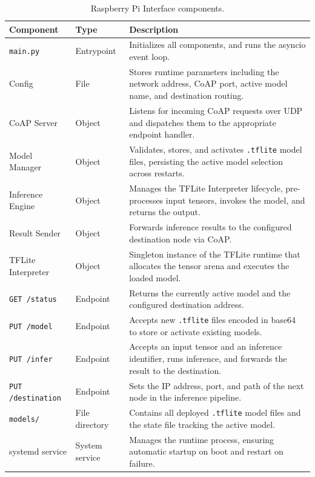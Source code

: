 \begin{table}
  \centering
  \small
  \setlength{\tabcolsep}{6pt}
  \renewcommand{\arraystretch}{1.2}
  \begin{tabularx}{0.95\textwidth}{|m{3.22cm}|>{\centering\arraybackslash}m{1.8cm}|X|}
    \hline
    \textbf{Component} & \textbf{Type} & \textbf{Description} \\
    \hline
    \texttt{main.py} & Entrypoint & Initializes all components, and runs the asyncio event loop. \\
    \hline
    Config & File & Stores runtime parameters including the network address, CoAP port, active model name, and destination routing. \\
    \hline
    CoAP Server & Object & Listens for incoming CoAP requests over UDP and dispatches them to the appropriate endpoint handler. \\
    \hline
    Model Manager & Object & Validates, stores, and activates \texttt{.tflite} model files, persisting the active model selection across restarts. \\
    \hline
    Inference Engine & Object & Manages the TFLite Interpreter lifecycle, pre-processes input tensors, invokes the model, and returns the output. \\
    \hline
    Result Sender & Object & Forwards inference results to the configured destination node via CoAP. \\
    \hline
    TFLite Interpreter & Object & Singleton instance of the TFLite runtime that allocates the tensor arena and executes the loaded model. \\
    \hline
    \texttt{GET /status} & Endpoint & Returns the currently active model and the configured destination address. \\
    \hline
    \texttt{PUT /model} & Endpoint & Accepts new \texttt{.tflite} files encoded in base64 to store or activate existing models.\\
    \hline
    \texttt{PUT /infer} & Endpoint & Accepts an input tensor and an inference identifier, runs inference, and forwards the result to the destination. \\
    \hline
    \texttt{PUT /destination} & Endpoint & Sets the IP address, port, and path of the next node in the inference pipeline. \\
    \hline
    \texttt{models/} & File directory & Contains all deployed \texttt{.tflite} model files and the state file tracking the active model. \\
    \hline
    systemd service & System service & Manages the runtime process, ensuring automatic startup on boot and restart on failure. \\
    \hline
  \end{tabularx}
  \vspace{2mm}
  \caption{Raspberry Pi Interface components.}
  \label{tab:RPi-components}
\end{table}

